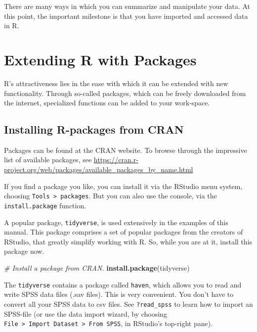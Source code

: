 \documentclass[]{book}
\newenvironment{Shaded}{\begin{snugshade}}{\end{snugshade}}
\newcommand{\KeywordTok}[1]{\textcolor[rgb]{0.13,0.29,0.53}{\textbf{#1}}}
\newcommand{\CommentTok}[1]{\textcolor[rgb]{0.56,0.35,0.01}{\textit{#1}}}
\newcommand{\NormalTok}[1]{#1}
\begin{document}
There are many ways in which you can summarize and manipulate your data.
At this point, the important milestone is that you have imported and
accessed data in R.

\section{Extending R with Packages}\label{extending-r-with-packages}


R's attractiveness lies in the ease with which it can be extended with
new functionality. Through so-called packages, which can be freely
downloaded from the internet, specialized functions can be added to your
work-space.

\subsection{Installing R-packages from
CRAN}\label{installing-r-packages-from-cran}

 

Packages can be found at the CRAN website. To browse through the
impressive list of available packages, see
\url{https://cran.r-project.org/web/packages/available_packages_by_name.html}

If you find a package you like, you can install it via the RStudio menu
system, choosing \texttt{Tools\ \textgreater{}\ packages}. But you can
also use the console, via the \texttt{install.package} function.

A popular package, \texttt{tidyverse}, is used extensively in the
examples of this manual. This package comprises a set of popular
packages from the creators of RStudio, that greatly simplify working
with R. So, while you are at it, install this package now.

\begin{Shaded}
\begin{Highlighting}[]
\CommentTok{# Install a package from CRAN.}
\KeywordTok{install.package}\NormalTok{(tidyverse)}
\end{Highlighting}
\end{Shaded}

The \texttt{tidyverse} contains a package called \texttt{haven}, which
allows you to read and write SPSS data files (.sav files). This is very
convenient. You don't have to convert all your SPSS data to csv files.
See \texttt{?read\_spss} to learn how to import an SPSS-file (or use the
data import wizard, by choosing
\texttt{File\ \textgreater{}\ Import\ Dataset\ \textgreater{}\ From\ SPSS},
in RStudio's top-right pane).
\end{document}
